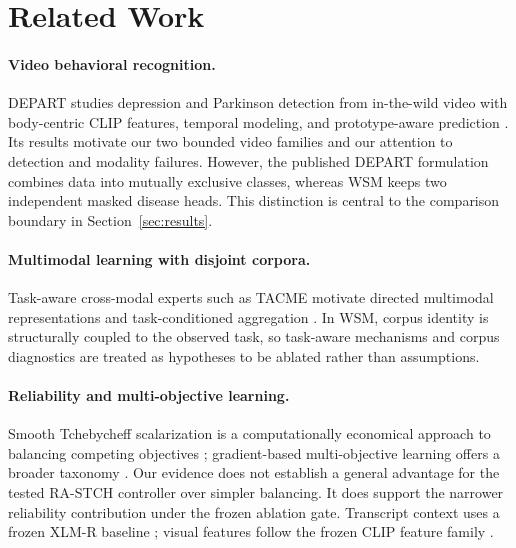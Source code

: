 \section{Related Work}

\paragraph{Video behavioral recognition.} DEPART studies depression and Parkinson detection from in-the-wild video with body-centric CLIP features, temporal modeling, and prototype-aware prediction \citep{ryumina2026depart}. Its results motivate our two bounded video families and our attention to detection and modality failures. However, the published DEPART formulation combines data into mutually exclusive classes, whereas WSM keeps two independent masked disease heads. This distinction is central to the comparison boundary in Section~\ref{sec:results}.

\paragraph{Multimodal learning with disjoint corpora.} Task-aware cross-modal experts such as TACME motivate directed multimodal representations and task-conditioned aggregation \citep{ryumina2025tacme}. In WSM, corpus identity is structurally coupled to the observed task, so task-aware mechanisms and corpus diagnostics are treated as hypotheses to be ablated rather than assumptions.

\paragraph{Reliability and multi-objective learning.} Smooth Tchebycheff scalarization is a computationally economical approach to balancing competing objectives \citep{lin2024stch}; gradient-based multi-objective learning offers a broader taxonomy \citep{chen2025moo}. Our evidence does not establish a general advantage for the tested RA-STCH controller over simpler balancing. It does support the narrower reliability contribution under the frozen ablation gate. Transcript context uses a frozen XLM-R baseline \citep{conneau2020xlmr}; visual features follow the frozen CLIP feature family \citep{radford2021clip}.
